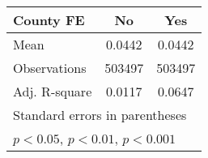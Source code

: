 \begin{table}[htbp]
{\begin{tabular}{l*{2}{c}}
            County FE                              & No                               & Yes                              \\
            \midrule
            Mean                                   & 0.0442                           & 0.0442                           \\
            Observations                           & 503497                           & 503497                           \\
            Adj. R-square                          & 0.0117                           & 0.0647                           \\
            \bottomrule
            \multicolumn{3}{l}{\footnotesize Standard errors in parentheses}                                             \\
            \multicolumn{3}{l}{\footnotesize \sym{*} \(p<0.05\), \sym{**} \(p<0.01\), \sym{***} \(p<0.001\)}             \\
        \end{tabular}
    }
\end{table}
